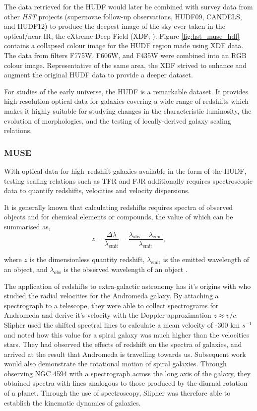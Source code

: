 \documentclass[12pt, twocolumn, nofootinbib]{revtex4-1}    %
\def\Minus{\texttt{-}}
\begin{document}
The data retrieved for the HUDF would later be combined with survey data from other \textit{HST} projects (supernovae follow-up observations, HUDF09, CANDELS, and HUDF12) to produce the deepest image of the sky ever taken in the optical/near-IR, the eXtreme Deep Field (XDF; \citealt{2013ApJS..209....6I}). Figure \ref{fig:hst_muse_hdf} contains a collapsed colour image for the HUDF region made using XDF data. The data from filters F775W, F606W, and F435W were combined into an RGB colour image. Representative of the same area, the XDF strived to enhance and augment the original HUDF data to provide a deeper dataset. 

For studies of the early universe, the HUDF is a remarkable dataset. It provides high-resolution optical data for galaxies covering a wide range of redshifts which makes it highly suitable for studying changes in the characteristic luminosity, the evolution of morphologies, and the testing of locally-derived galaxy scaling relations.

\vspace{2ex} %
\subsubsection{MUSE}
\noindent
With optical data for high--redshift galaxies available in the form of the HUDF, testing scaling relations such as TFR and FJR additionally requires spectroscopic data to quantify redshifts, velocities and velocity dispersions.

It is generally known that calculating redshifts requires spectra of observed objects and for chemical elements or compounds, the value of which can be summarised as,
\begin{equation}
    z=\frac{\Delta \lambda}{\lambda_{\text{emit}}}=\frac{\lambda_{\text{obs}}-\lambda_{\text{emit}}}{\lambda_{\text{emit}}},
    \label{eqn:redshift}
\end{equation}

where $z$ is the dimensionless quantity redshift, $\lambda_{\text{emit}}$ is the emitted wavelength of an object, and $\lambda_{\text{obs}}$ is the observed wavelength of an object \citep{1933AcHPh...6..110Z}.

The application of redshifts to extra-galactic astronomy has it's origins with \cite{1913LowOB...2...56S} who studied the radial velocities for the Andromeda galaxy. By attaching a spectrograph to a telescope, they were able to collect spectrograms for Andromeda and derive it's velocity with the Doppler approximation $z\approx v/c$. Slipher used the shifted spectral lines to calculate a mean velocity of $\Minus$300 km $s^{-1}$ and noted how this value for a spiral galaxy was much higher than the velocities stars. They had observed the effects of redshift on the spectra of galaxies, and arrived at the result that Andromeda is travelling towards us. Subsequent work \citep{1914LowOB...2...66S} would also demonstrate the rotational motion of spiral galaxies. Through observing NGC 4594 with a spectrograph across the long axis of the galaxy, they obtained spectra with lines analogous to those produced by the diurnal rotation of a planet. Through the use of spectroscopy, Slipher was therefore able to establish the kinematic dynamics of galaxies. 
\end{document}
